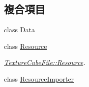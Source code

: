 \subsection*{複合項目}
\begin{DoxyCompactItemize}
\item 
class \hyperlink{class_magnum_1_1_texture_cube_file_1_1_data}{Data}
\item 
class \hyperlink{class_magnum_1_1_texture_cube_file_1_1_resource}{Resource}
\begin{DoxyCompactList}\small\item\em \hyperlink{class_magnum_1_1_texture_cube_file_1_1_resource}{Texture\+Cube\+File\+::\+Resource}. \end{DoxyCompactList}\item 
class \hyperlink{class_magnum_1_1_texture_cube_file_1_1_resource_importer}{Resource\+Importer}
\end{DoxyCompactItemize}
